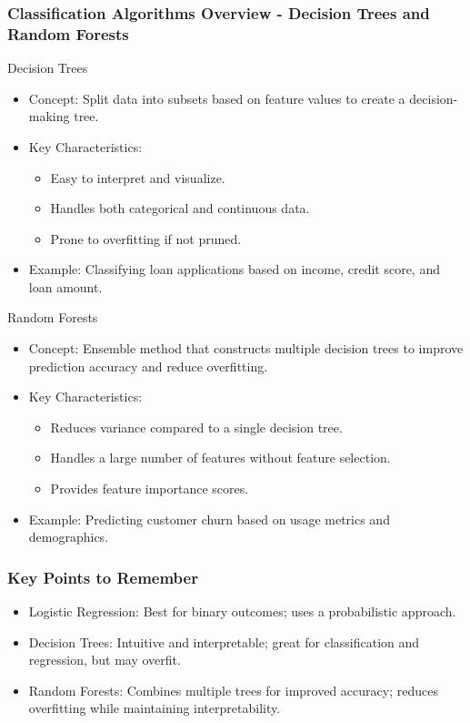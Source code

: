 \documentclass[aspectratio=169]{beamer}
\begin{document}
\begin{frame}[fragile]
    \frametitle{Classification Algorithms Overview - Decision Trees and Random Forests}
    \begin{block}{Decision Trees}
        \begin{itemize}
            \item Concept: Split data into subsets based on feature values to create a decision-making tree.
            \item Key Characteristics:
                \begin{itemize}
                    \item Easy to interpret and visualize.
                    \item Handles both categorical and continuous data.
                    \item Prone to overfitting if not pruned.
                \end{itemize}
            \item Example: Classifying loan applications based on income, credit score, and loan amount.
        \end{itemize}
    \end{block}
    
    \begin{block}{Random Forests}
        \begin{itemize}
            \item Concept: Ensemble method that constructs multiple decision trees to improve prediction accuracy and reduce overfitting.
            \item Key Characteristics:
                \begin{itemize}
                    \item Reduces variance compared to a single decision tree.
                    \item Handles a large number of features without feature selection.
                    \item Provides feature importance scores.
                \end{itemize}
            \item Example: Predicting customer churn based on usage metrics and demographics.
        \end{itemize}
    \end{block}
\end{frame}

\begin{frame}[fragile]
    \frametitle{Key Points to Remember}
    \begin{itemize}
        \item Logistic Regression: Best for binary outcomes; uses a probabilistic approach.
        \item Decision Trees: Intuitive and interpretable; great for classification and regression, but may overfit.
        \item Random Forests: Combines multiple trees for improved accuracy; reduces overfitting while maintaining interpretability.
    \end{itemize}
\end{frame}
\end{document}
